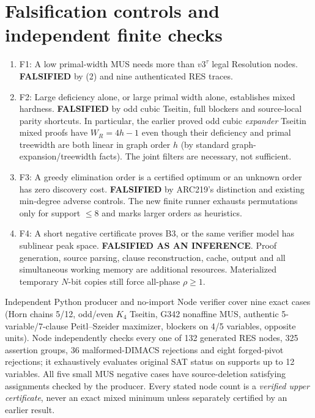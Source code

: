 \documentclass[11pt]{article}
\begin{document}
\section*{Falsification controls and independent finite checks}
\begin{enumerate}
\item[] F1: A low primal-width MUS needs more than $v3^\tau$ legal Resolution nodes. \textbf{FALSIFIED} by (2) and nine authenticated RES traces.
\item[] F2: Large deficiency alone, or large primal width alone, establishes mixed hardness. \textbf{FALSIFIED} by odd cubic Tseitin, full blockers and source-local parity shortcuts. In particular, the earlier proved odd cubic \emph{expander} Tseitin mixed proofs have $W_R=4h-1$ even though their deficiency and primal treewidth are both linear in graph order $h$ (by standard graph-expansion/treewidth facts). The joint filters are necessary, not sufficient.
\item[] F3: A greedy elimination order is a certified optimum or an unknown order has zero discovery cost. \textbf{FALSIFIED} by ARC219's distinction and existing min-degree adverse controls. The new finite runner exhausts permutations only for support $\le8$ and marks larger orders as heuristics.
\item[] F4: A short negative certificate proves B3, or the same verifier model has sublinear peak space. \textbf{FALSIFIED AS AN INFERENCE}. Proof generation, source parsing, clause reconstruction, cache, output and all simultaneous working memory are additional resources. Materialized temporary $N$-bit copies still force all-phase $\rho\ge1$.
\end{enumerate}
Independent Python producer and no-import Node verifier cover nine exact cases (Horn chains 5/12, odd/even $K_4$ Tseitin, G342 nonaffine MUS, authentic 5-variable/7-clause Peitl--Szeider maximizer, blockers on 4/5 variables, opposite units). Node independently checks every one of 132 generated RES nodes, 325 assertion groups, 36 malformed-DIMACS rejections and eight forged-pivot rejections; it exhaustively evaluates original SAT status on supports up to 12 variables. All five small MUS negative cases have source-deletion satisfying assignments checked by the producer. Every stated node count is a \emph{verified upper certificate}, never an exact mixed minimum unless separately certified by an earlier result.
\end{document}

